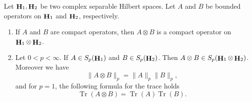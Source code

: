 \documentclass[10pt,a4paper]{amsart}
\DeclareMathOperator{\Hi}{{\bf H}}
\DeclareMathOperator{\Tr}{Tr}
\begin{document}
\begin{thm}\label{scprt} Let $\Hi_1, \Hi_2$ be  two complex separable Hilbert spaces. Let $A$ and $B$ be bounded operators  on $ \Hi_1$ and  $ \Hi_2$, respectively.
	\begin{enumerate}
		\item If $A$ and $B$ are compact  operators, then $A\otimes B$ is a compact operator on  $ \Hi_1\otimes \Hi_2$. 

\item Let $0<p<\infty$. If $A\in S_p(\Hi_1)$ and $B\in S_p(\Hi_2)$. Then  $A\otimes B\in S_p( \Hi_1\otimes \Hi_2)$. Moreover we have
\[\|A\otimes B\|_p=\|A\|_p\|B\|_p,\]
and for $p=1$, the following formula for the trace holds
	\[\Tr (A\otimes B)=\Tr (A)\Tr (B).\]
\end{enumerate}
\end{thm}
\end{document}
